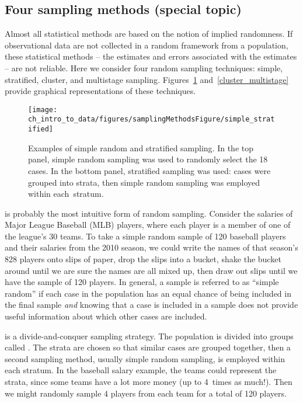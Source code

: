 \subsection{Four sampling methods (special topic)}
\label{fourSamplingMethods}
\label{threeSamplingMethods}

Almost all statistical methods are based on the notion of implied randomness. If observational data are not collected in a random framework from a population, these statistical methods -- the estimates and errors associated with the estimates -- are not reliable. Here we consider four random sampling techniques: simple, stratified, cluster, and multistage sampling. Figures~\ref{simple_stratified} and~\ref{cluster_multistage} provide graphical representations of these techniques.

\begin{figure}
\centering
\texttt{[image: ch\_intro\_to\_data/figures/samplingMethodsFigure/simple\_stratified]}
\caption{Examples of simple random and stratified sampling. In the top panel, simple random sampling was used to randomly select the 18 cases. In the bottom panel, stratified sampling was used: cases were grouped into strata, then simple random sampling was employed within \mbox{each stratum}.}
\label{simple_stratified}
\end{figure}

 is probably the most intuitive form of random sampling. Consider the salaries of Major League Baseball (MLB) players, where each player is a member of one of the league's 30 teams. To take a simple random sample of 120 baseball players and their salaries from the 2010 season, we could write the names of that season's 828 players onto slips of paper, drop the slips into a bucket, shake the bucket around until we are sure the names are all mixed up, then draw out slips until we have the sample of 120 players. In general, a sample is referred to as ``simple random'' if each case in the population has an equal chance of being included in the final sample \emph{and} knowing that a case is included in a sample does not provide useful information about which other cases are included.

 is a divide-and-conquer sampling strategy. The population is divided into groups called . The strata are chosen so that similar cases are grouped together, then a second sampling method, usually simple random sampling, is employed within each stratum. In the baseball salary example, the teams could represent the strata, since some teams have a lot more money (up to 4~times as much!). Then we might randomly sample 4 players from each team for a total of 120 players.

